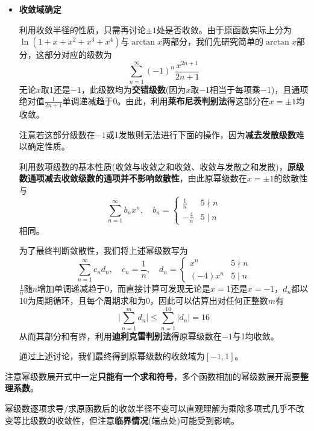 \documentclass[a4paper,UTF8,fontset=windows,AutoFakeBold]{ctexart}
\newcommand*{\suminf}[1][n=1]{\sum_{#1}^\infty}
\newcommand*{\note}{\noindent *}
\theoremstyle{ex}
\begin{document}
\begin{framed}
{\begin{itemize}
        另一方面，当$|x|>1$时若原幂级数收敛，通项极限应为0，从而通项中所有是10的倍数的$n$构成的\textbf{子列}极限应为0，但利用\textbf{数列极限阶估算}结论(可见上学期讲义2.4.1)有
        $$\lim_{m\to\infty}-\frac{4}{(10m)}x^{10m}=\infty$$
        从而此子列的极限为无穷，矛盾。

        综合以上，原幂级数的收敛半径为1。

        \item \textbf{收敛域确定}
        
        利用收敛半径的性质，只需再讨论$\pm1$处是否收敛。由于原函数实际上分为$\ln(1+x+x^2+x^3+x^4)$与$\arctan x$两部分，我们先研究简单的$\arctan x$部分，这部分对应的级数为
        $$\suminf(-1)^n\frac{x^{2n+1}}{2n+1}$$
        无论$x$取1还是$-1$，此级数均为\textbf{交错级数}(因为$x$取$-1$相当于每项乘$-1$)，且通项绝对值$\frac{1}{2n+1}$单调递减趋于0。由此，利用\textbf{莱布尼茨判别法}得这部分在$x=\pm1$均收敛。

        \note 注意若这部分级数在$-1$或1发散则无法进行下面的操作，因为\textbf{减去发散级数}难以确定性质。

        利用数项级数的基本性质(收敛与收敛之和收敛、收敛与发散之和发散)，\textbf{原级数通项减去收敛级数的通项并不影响敛散性}，由此原幂级数在$x=\pm1$的敛散性与
        $$\suminf b_nx^n,\quad b_n=\begin{cases}\frac{1}{n}&5\nmid n\\-\frac{4}{n}&5\mid n\end{cases}$$
        相同。

        为了最终判断敛散性，我们将上述幂级数写为
        $$\suminf c_nd_n,\quad c_n=\frac{1}{n},\quad d_n=\begin{cases}x^n&5\nmid n\\(-4)x^n&5\mid n\end{cases}$$
        $\frac{1}{n}$随$n$增加单调递减趋于0，而直接计算可发现无论是$x=1$还是$x=-1$，$d_n$都以10为周期循环，且每个周期求和为0，因此可以估算出对任何正整数$m$有
        $$\bigg|\sum_{n=1}^md_n\bigg|\le\sum_{n=1}^{10}|d_n|=16$$
        从而其部分和有界，利用\textbf{迪利克雷判别法}得原幂级数在$-1$与1均收敛。

        通过上述讨论，我们最终得到原幂级数的收敛域为$[-1,1]$。
    \end{itemize}
}
\end{framed}

\note 注意幂级数展开式中一定\textbf{只能有一个求和符号}，多个函数相加的幂级数展开需要\textbf{整理系数}。

\note 幂级数逐项求导/求原函数后的收敛半径不变可以直观理解为乘除多项式几乎不改变等比级数的收敛性，但注意\textbf{临界情况}(端点处)可能受到影响。
\end{document}
